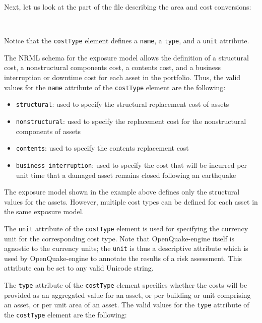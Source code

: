 Next, let us look at the part of the file describing the area and cost
conversions:

\inputminted[firstline=10,firstnumber=10,lastline=15,fontsize=\footnotesize,frame=single,linenos,bgcolor=lightgray]{xml}{oqum/risk/Verbatim/input_exposure_minimal.xml}\\

Notice that the \Verb+costType+ element defines a \Verb+name+, a \Verb+type+, 
and a \Verb+unit+ attribute.

The NRML schema for the exposure model allows the definition of a structural
cost, a nonstructural components cost, a contents cost, and a business
interruption or downtime cost for each asset in the portfolio. Thus, the valid
values for the \Verb+name+ attribute of the \Verb+costType+ element are the
following:

\begin{itemize}

    \item \Verb+structural+: used to specify the structural replacement cost
    of assets

    \item \Verb+nonstructural+: used to specify the replacement cost for the
    nonstructural components of assets

    \item \Verb+contents+: used to specify the contents replacement cost

    \item \Verb+business_interruption+: used to specify the cost that will be 
    incurred per unit time that a damaged asset remains closed following an 
    earthquake

\end{itemize}

The exposure model shown in the example above defines only the structural
values for the assets. However, multiple cost types can be defined for each
asset in the same exposure model.

The \Verb+unit+ attribute of the \Verb+costType+ element is used for
specifying the currency unit for the corresponding cost type. Note that
OpenQuake-engine itself is agnostic to the currency units; the \Verb+unit+ is
thus a descriptive attribute which is used by OpenQuake-engine to annotate the
results of a risk assessment. This attribute can be set to any valid Unicode
string.

The \Verb+type+ attribute of the \Verb+costType+ element specifies whether the
costs will be provided as an aggregated value for an asset, or per building or
unit comprising an asset, or per unit area of an asset. The valid values for
the \Verb+type+ attribute of the \Verb+costType+ element are the following:

